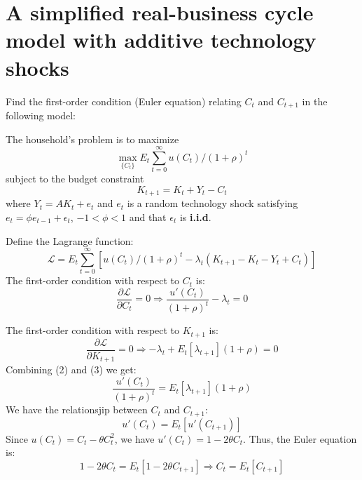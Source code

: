 \section{A simplified real-business cycle model with additive technology shocks}

\begin{problem}[1]
    Find the first-order condition (Euler equation) relating $C_t$ and $C_{t+1}$ in the following model:
\end{problem}

\begin{solution}
    The household's problem is to maximize
    \begin{equation*}
        \max_{\{C_t\}} E_{t} \sum_{t=0}^{\infty} u(C_t)/{(1+\rho)^t}
    \end{equation*}
    subject to the budget constraint
    \begin{equation*}
        K_{t+1} = K_t + Y_t - C_t
    \end{equation*}
    where $Y_t = A K_t + e_t$ and $e_t$ is a random technology shock satisfying $e_t = \phi e_{t-1} + \epsilon_t $, $-1 < \phi < 1$ and that $\epsilon_t$ is \textbf{i.i.d}.

    Define the Lagrange function:
    \begin{equation}
        \mathcal{L} = E_t  \sum_{t=0}^{\infty} \left[ u(C_t)/{(1+\rho)^t} - \lambda_t (K_{t+1} - K_t - Y_t + C_t) \right]
    \end{equation}
    The first-order condition with respect to $C_t$ is:
    \begin{equation}
        \frac{\partial \mathcal{L}}{\partial C_t} = 0 \Rightarrow \frac{u'(C_t)}{(1+\rho)^{t} } - \lambda_t = 0
    \end{equation}

    The first-order condition with respect to $K_{t+1}$ is:
    \begin{equation}
        \frac{\partial \mathcal{L}}{\partial K_{t+1}} = 0 \Rightarrow -\lambda_{t} + E_t\left[\lambda_{t+1}\right](1+\rho) = 0
    \end{equation}
    Combining (2) and (3) we get:
    \begin{equation}
        \frac{u'(C_t)}{(1+\rho)^{t} } = E_t\left[\lambda_{t+1}\right](1+\rho)
    \end{equation}
    We have the relationsjip between $C_t$ and $C_{t+1}$:
    \begin{equation}
        u'(C_t) = E_t\left[u'(C_{t+1})\right]
    \end{equation}
    Since $u(C_t) = C_t - \theta C_t^2$, we have $u'(C_t) = 1 - 2\theta C_t$. Thus, the Euler equation is:
    \begin{equation}
        1 - 2\theta C_t = E_t\left[1 - 2\theta C_{t+1}\right] \Rightarrow C_t = E_t\left[C_{t+1}\right]
    \end{equation}
\end{solution}

